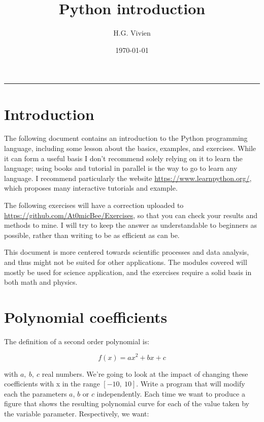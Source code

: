 \documentclass[twocolumn]{article}
\title{Python introduction}
\author[1]{H.G. Vivien}
\affil[1]{Laboratoire d'Astrophysique de Marseille - Marseille, France}
\date{\today}
\begin{document}

\onecolumn

\maketitle
\hrule

\section*{Introduction}

The following document contains an introduction to the Python programming language, including some lesson about the basics, examples, and exercises. While it can form a useful basis I don't recommend solely relying on it to learn the language; using books and tutorial in parallel is the way to go to learn any language. I recommend particularly the website \href{https://www.learnpython.org/}{https://www.learnpython.org/}, which proposes many interactive tutorials and example.

The following exercises will have a correction uploaded to \href{https://github.com/At0micBee/Exercises}{https://github.com/At0micBee/Exercises}, so that you can check your results and methods to mine. I will try to keep the answer as understandable to beginners as possible, rather than writing to be as efficient as can be.

This document is more centered towards scientific processes and data analysis, and thus might not be suited for other applications. The modules covered will mostly be used for science application, and the exercises require a solid basis in both math and physics.

\twocolumn


\section{Polynomial coefficients}\label{sec:polynomial_coefficients}

The definition of a second order polynomial is:

\begin{equation}\label{eq:poly}
    f(x) = ax^2 + bx + c
\end{equation}

with $a,~b,~c$ real numbers. We're going to look at the impact of changing these coefficients with x in the range $[-10,~10]$. Write a program that will modify each the parameters $a$, $b$ or $c$ independently. Each time we want to produce a figure that shows the resulting polynomial curve for each of the value taken by the variable parameter. Respectively, we want:
\end{document}
